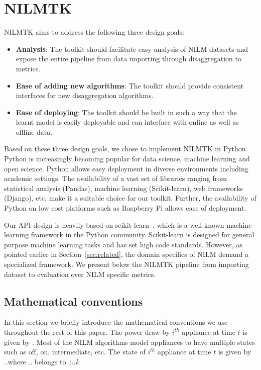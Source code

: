 \documentclass{sig-alternate}
\newcommand{\secref}[1]{Section~\ref{#1}}
\begin{document}
\section{NILMTK}
\label{sec:nilmtk}
NILMTK aims to address the following three design goals:
\begin{itemize}
\item \textbf{Analysis}: The toolkit should facilitate easy analysis of NILM datasets and expose the entire pipeline from
data importing through disaggregation to metrics. 
\item \textbf{Ease of adding new algorithms}: The toolkit should provide consistent interfaces for new disaggregation algorithms.
\item \textbf{Ease of deploying}: The toolkit should be built in such a way that the learnt model is easily deployable and can interface with online as well as offline data.
\end{itemize}
Based on these three design goals, we chose to implement NILMTK in Python. Python is increasingly becoming popular for data science, machine learning and open science. Python allows easy deployment in diverse environments including academic settings. The availability of a vast set of libraries ranging from statistical analysis (Pandas), machine learning (Scikit-learn), web frameworks (Django), etc, make it a suitable choice for our toolkit. Further, the availability of Python on low cost platforms such as Raspberry Pi allows ease of deployment.

Our API design is heavily based on scikit-learn~\cite{scikit, scikit_api}, which is a well known machine learning framework in the Python community. Scikit-learn is designed for general purpose machine learning tasks and has set high code standards. However, as pointed earlier in \secref{sec:related}, the domain specifics of NILM demand a specialized framework. We present below the NILMTK pipeline from importing dataset to evaluation over NILM specific metrics.

\subsection{Mathematical conventions}
In this section we briefly introduce the mathematical conventions we use throughout the rest of this paper. The power draw by $i^{th}$ appliance at time $t$ is given by . Most of the NILM algorithms model appliances to have multiple states such as off, on, intermediate, etc. The state of $i^{th}$ appliance at time $t$ is given by ..where .. belongs to ${1..k}$
\end{document}
